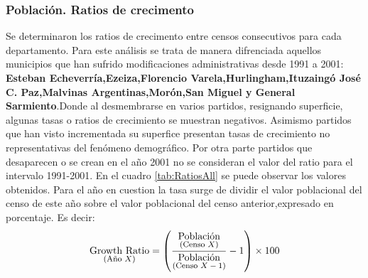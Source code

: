 \documentclass{article}
\theoremstyle{mytheoremstyle}
\theoremstyle{mytheoremstyle}
\theoremstyle{myproblemstyle}
\begin{document}
 \subsubsection{Población. Ratios de crecimento}
  Se determinaron los ratios de crecimento entre censos consecutivos para cada departamento.
  Para este análisis se trata de manera difrenciada aquellos municipios que han sufrido modificaciones administrativas
  desde 1991  a 2001: \textbf{Esteban Echeverría,Ezeiza,Florencio Varela,Hurlingham,Ituzaingó
  José C. Paz,Malvinas Argentinas,Morón,San Miguel y General Sarmiento}.Donde al desmembrarse en varios partidos,
  resignando superficie, algunas tasas o ratios de crecimiento 
  se muestran negativos. Asimismo partidos que han visto incrementada su superfice presentan tasas de crecimiento no representativas del 
  fenómeno demográfico.\newline
  Por otra parte partidos que desaparecen o se crean en el año 2001 no se consideran el valor del ratio para el intervalo 1991-2001.\newline
    En el cuadro \ref{tab:RatiosAll} se puede observar los valores obtenidos. Para el año en cuestion la tasa surge de dividir el valor poblacional
  del censo de este año sobre el valor poblacional del censo anterior,expresado en porcentaje.\newline
  Es decir: 
  \begin{equation}
    \underset{\text{\footnotesize(Año $X$)}}{\text{Growth Ratio}} = 
    \left( \frac{\underset{\text{\footnotesize(Censo $X$)}}{\text{Población}}}{\underset{\text{\footnotesize(Censo $X-1$)}}{\text{Población}}} - 1 \right) \times 100
  \end{equation}
\end{document}
